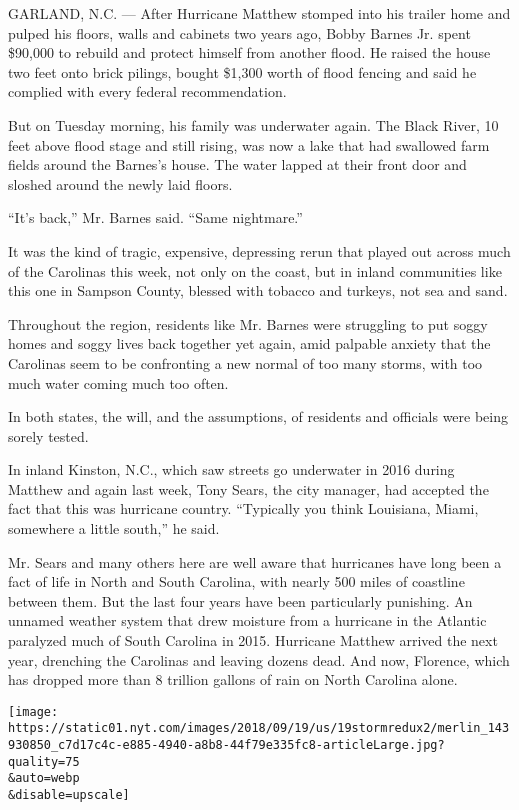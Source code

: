 GARLAND, N.C. --- After Hurricane Matthew stomped into his trailer home
and pulped his floors, walls and cabinets two years ago, Bobby Barnes
Jr. spent \$90,000 to rebuild and protect himself from another flood. He
raised the house two feet onto brick pilings, bought \$1,300 worth of
flood fencing and said he complied with every federal recommendation.

But on Tuesday morning, his family was underwater again. The Black
River, 10 feet above flood stage and still rising, was now a lake that
had swallowed farm fields around the Barnes's house. The water lapped at
their front door and sloshed around the newly laid floors.

``It's back,'' Mr. Barnes said. ``Same nightmare.''

It was the kind of tragic, expensive, depressing rerun that played out
across much of the Carolinas this week, not only on the coast, but in
inland communities like this one in Sampson County, blessed with tobacco
and turkeys, not sea and sand.

Throughout the region, residents like Mr. Barnes were struggling to put
soggy homes and soggy lives back together yet again, amid palpable
anxiety that the Carolinas seem to be confronting a new normal of too
many storms, with too much water coming much too often.

In both states, the will, and the assumptions, of residents and
officials were being sorely tested.

In inland Kinston, N.C., which saw streets go underwater in 2016 during
Matthew and again last week, Tony Sears, the city manager, had accepted
the fact that this was hurricane country. ``Typically you think
Louisiana, Miami, somewhere a little south,'' he said.

Mr. Sears and many others here are well aware that hurricanes have long
been a fact of life in North and South Carolina, with nearly 500 miles
of coastline between them. But the last four years have been
particularly punishing. An unnamed weather system that drew moisture
from a hurricane in the Atlantic paralyzed much of South Carolina in
2015. Hurricane Matthew arrived the next year, drenching the Carolinas
and leaving dozens dead. And now, Florence, which has dropped more than
8 trillion gallons of rain on North Carolina alone.

\texttt{[image: https://static01.nyt.com/images/2018/09/19/us/19stormredux2/merlin\_143930850\_c7d17c4c-e885-4940-a8b8-44f79e335fc8-articleLarge.jpg?quality=75\\\&auto=webp\\\&disable=upscale]}

